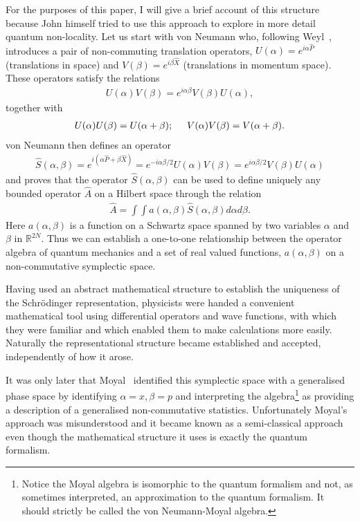 \documentclass[12pt]{article}
\begin{document}
For the purposes of this paper, I will give a brief account of this structure because John himself tried to use this approach to explore in more detail quantum non-locality.  Let us  start with von Neumann who, following Weyl~\cite{hw28}, 
 introduces a pair of non-commuting translation operators, $U(\alpha)=e^{i\alpha {\widehat P}}$ (translations in space) and $V(\beta)=e^{i\beta{\widehat X}}$ (translations in momentum space).  These operators satisfy the relations   
\begin{eqnarray}
U(\alpha)V(\beta) = e^{i\alpha\beta}V(\beta)U(\alpha),	\label{eq:Weyl}
\end{eqnarray}
together with
\begin{eqnarray}
U(\alpha)U(\beta)=U(\alpha + \beta);  \hspace{0.5cm}  V(\alpha)V(\beta)=V(\alpha + \beta). \nonumber
\end{eqnarray}						
von Neumann then defines an operator
\begin{eqnarray}
\widehat S(\alpha,\beta)=e^{i(\alpha\widehat P+\beta \widehat X)}=e^{-i\alpha\beta/2}U(\alpha)V(\beta)=e^{i\alpha\beta/2}V(\beta)U(\alpha)  \nonumber
\end{eqnarray}
and proves that the operator $\widehat S(\alpha, \beta)$ can  be used to define uniquely any bounded operator $\hat A$ on a Hilbert space  through the relation
\begin{eqnarray}
\hat A=\int\int a(\alpha, \beta)\widehat S(\alpha,\beta)d\alpha d\beta.
\label{eq:symA}				%
\end{eqnarray}
Here $a(\alpha,\beta)$ is a function on a Schwartz space spanned by two variables $\alpha$ and $\beta$ in $\mathbb R^{2N}$. Thus we can establish a one-to-one relationship between the operator algebra of quantum mechanics and a set of real valued functions, $a(\alpha, \beta)$ on a non-commutative symplectic space.

Having used an abstract mathematical structure to establish the uniqueness of the Schr\"{o}dinger representation, physicists were handed a convenient mathematical tool using differential operators and wave functions, with which they were familiar and which enabled them to make calculations more easily.  Naturally the representational structure became established and accepted, independently of how it arose.

It was only later that Moyal~\cite{jm49} identified this symplectic space with a generalised phase space by identifying $\alpha=x, \beta=p$ and interpreting the algebra\footnote{Notice the Moyal algebra is isomorphic to the quantum formalism and not, as sometimes interpreted, an approximation to the quantum formalism. It should strictly be called the von Neumann-Moyal algebra.}  as providing a description of a generalised non-commutative statistics.  Unfortunately Moyal's approach was misunderstood and it became known as a semi-classical approach even though the mathematical structure it uses is exactly the quantum formalism.   
\end{document}
